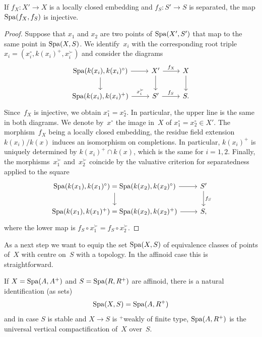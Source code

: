 \begin{lem} \label{lem:Spa-injective}
    If $f_X \colon X' \to X$ is a locally closed embedding and $f_S \colon S' \to S$ is separated, the map $\operatorname{Spa}(f_X,f_S)$ is injective.
\end{lem}

\begin{proof}
    Suppose that $x_1$ and $x_2$ are two points of $\operatorname{Spa}(X',S')$ that map to the same point in $\operatorname{Spa}(X,S)$.
   We identify~$x_i$ with the corresponding root triple $x_i = (x_i^\circ,k(x_i)^+,x_i^\succ)$ and consider the diagrams
    \[
 \begin{tikzcd}
     \Spa(k(x_i),k(x_i)^\circ)    \ar[r]        \ar[d]  & X'    \ar[r,"f_X"]    \ar[d]  & X \ar[d]  \\
     \Spa(k(x_i),k(x_i)^+)        \ar[r,"x_i^\succ"]          & S'    \ar[r,"f_S"]            & S.
 \end{tikzcd}
\]
Since~$f_X$ is injective, we obtain $x_1^\circ = x_2^\circ$.
In particular, the upper line is the same in both diagrams.
We denote by~$x^\circ$ the image in~$X$ of $x_1^\circ = x_2^\circ \in X'$.
The morphism~$f_X$ being a locally closed embedding, the residue field extension $k(x_i)/k(x)$ induces an isomorphism on completions.
In particular, $k(x_i)^+$ is uniquely determined by $k(x_i)^+ \cap k(x)$, which is the same for $i=1,2$.
Finally, the morphisms~$x_1^\succ$ and~$x_2^\succ$ coincide by the valuative criterion for separatedness applied to the square
\[
    \begin{tikzcd}
        \Spa(k(x_1),k(x_1)^\circ) = \Spa(k(x_2),k(x_2)^\circ)   \ar[r]  \ar[d]  & S' \ar[d,"f_S"]    \\
        \Spa(k(x_1),k(x_1)^+) = \Spa(k(x_2),k(x_2)^+)           \ar[r]  & S,
    \end{tikzcd}
\]
where the lower map is $f_S \circ x_1^\succ = f_S \circ x_2^\succ$.
\end{proof}

As a next step we want to equip the set $\operatorname{Spa}(X,S)$ of equivalence classes of points of~$X$ with centre on~$S$ with a topology.
In the affinoid case this is straightforward.

\begin{lem} \label{lem:Spa-barX-affinoid}
    If $X = \operatorname{Spa}(A,A^+)$ and $S = \operatorname{Spa}(R,R^+)$ are affinoid, there is a natural identification (as sets)
    \[
    \operatorname{Spa}(X,S) = \operatorname{Spa}(A,R^+)
    \]
    and in case $S$ is stable and $X \to S$ is ${}^+$weakly of finite type, $\operatorname{Spa}(A,R^+)$ is the universal vertical compactification of~$X$ over~$S$.
\end{lem}

